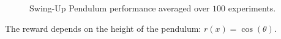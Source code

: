 \begin{figure}
\begin{minipage}{\textwidth}
\centering
{}
\hspace{-.5cm}
\end{minipage}
\caption[Swing-Up Pendulum results]{Swing-Up Pendulum performance averaged over $100$ experiments.}\label{F:pendulum}
\end{figure}
The reward depends on the height of the pendulum: $r(x) = \cos(\theta)$.
